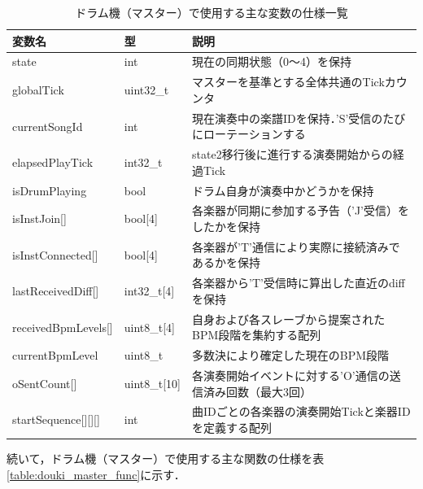 \begin{table}[H]
    \caption{ドラム機（マスター）で使用する主な変数の仕様一覧}
    \centering
    \label{table:douki_master_var}
    \begin{tabular}{p{3.9cm}p{3.4cm}p{6.2cm}}
    \hline
    \textbf{変数名} & \textbf{型} & \textbf{説明}\\
    \hline
    state & int & 現在の同期状態（0〜4）を保持\\
    \hline
    globalTick & uint32\_t & マスターを基準とする全体共通のTickカウンタ\\
    \hline
    currentSongId & int & 現在演奏中の楽譜IDを保持．'S'受信のたびにローテーションする\\
    \hline
    elapsedPlayTick & int32\_t & state2移行後に進行する演奏開始からの経過Tick\\
    \hline
    isDrumPlaying & bool & ドラム自身が演奏中かどうかを保持\\
    \hline
    isInstJoin[] & bool[4] & 各楽器が同期に参加する予告（'J'受信）をしたかを保持\\
    \hline
    isInstConnected[] & bool[4] & 各楽器が'T'通信により実際に接続済みであるかを保持\\
    \hline
    lastReceivedDiff[] & int32\_t[4] & 各楽器から'T'受信時に算出した直近のdiffを保持\\
    \hline
    receivedBpmLevels[] & uint8\_t[4] & 自身および各スレーブから提案されたBPM段階を集約する配列\\
    \hline
    currentBpmLevel & uint8\_t & 多数決により確定した現在のBPM段階\\
    \hline
    oSentCount[] & uint8\_t[10] & 各演奏開始イベントに対する'O'通信の送信済み回数（最大3回）\\
    \hline
    startSequence[][][] & int & 曲IDごとの各楽器の演奏開始Tickと楽器IDを定義する配列\\
    \hline
    \end{tabular}
\end{table}

続いて，ドラム機（マスター）で使用する主な関数の仕様を表\ref{table:douki_master_func}に示す．

